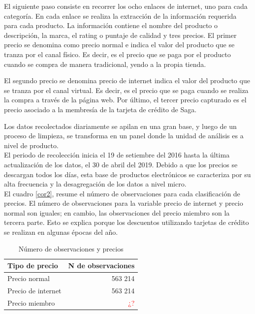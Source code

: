 \documentclass[12pt,a4paper,pdflatex]{article}
\begin{document}
El siguiente paso consiste en recorrer los ocho enlaces de internet, uno para cada categoría. En cada enlace se realiza la extracción de la información requerida para cada producto. La información contiene el nombre del producto o descripción, la marca, el rating o puntaje de calidad y tres precios. El primer precio se denomina como precio normal e indica el valor del producto que se tranza por el canal físico. Es decir, es el precio que se paga por el producto cuando se compra de manera tradicional, yendo a la propia tienda.

El segundo precio se denomina precio de internet indica el valor del producto que se tranza por el canal virtual. Es decir, es el precio que se paga cuando se realiza la compra a través de la página web. Por último, el tercer precio capturado es el precio asociado a la membresía de la tarjeta de crédito de Saga.

Los datos recolectados diariamente se apilan en una gran base, y luego de un proceso de limpieza, se transforma en un panel donde la unidad de análisis es a nivel de producto.\\
El periodo de recolección inicia el 19 de setiembre del 2016 hasta la última actualización de los datos, el 30 de abril del 2019. Debido a que los precios se descargan todos los días, esta base de productos electrónicos se caracteriza por su alta frecuencia y la desagregación de los datos a nivel micro.\\
El cuadro \ref{cor2}, resume el número de observaciones para cada clasificación de precios. El número de observaciones para la variable precio de internet y precio normal son iguales; en cambio, las observaciones del precio miembro son la tercera parte. Esto se explica porque los descuentos utilizando tarjetas de crédito se realizan en algunas épocas del año. \\

\begin{table}[h!]
\caption{Número de observaciones y precios}\label{cor2}
\centering
\begin{tabular}{lr}
\hline
Tipo de precio &  N de observaciones\\ \hline
Precio normal & 563 214 \\
Precio de internet & 563 214 \\
Precio miembro & \textcolor{red}{¿?}\\
\hline
\end{tabular}
\label{table:1}
\end{table}
\end{document}
